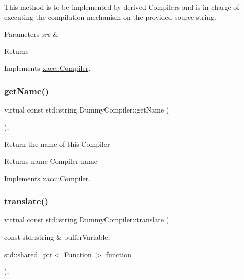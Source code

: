 This method is to be implemented by derived Compilers and is in charge of executing the compilation mechanism on the provided source string. 
\begin{DoxyParams}{Parameters}
{\em src} & \\
\hline
\end{DoxyParams}
\begin{DoxyReturn}{Returns}

\end{DoxyReturn}


Implements \hyperlink{a01100_a9092f5f779b570c91569b59621280c04}{xacc\+::\+Compiler}.

\mbox{\label{a00972_a76460cb78671dc2cf42f2bebf8fb80c7}} 
\subsubsection{\texorpdfstring{get\+Name()}{getName()}}
{\footnotesize\ttfamily virtual const std\+::string Dummy\+Compiler\+::get\+Name (\begin{DoxyParamCaption}{ }\end{DoxyParamCaption})\hspace{0.3cm}{\ttfamily [inline]}, {\ttfamily [virtual]}}

Return the name of this Compiler \begin{DoxyReturn}{Returns}
name Compiler name 
\end{DoxyReturn}


Implements \hyperlink{a01100_a87fca9100e6462122f5b687c3a0fb3fb}{xacc\+::\+Compiler}.

\mbox{\label{a00972_a606c27150c8d374242b8824e45b1e0c1}} 
\subsubsection{\texorpdfstring{translate()}{translate()}}
{\footnotesize\ttfamily virtual const std\+::string Dummy\+Compiler\+::translate (\begin{DoxyParamCaption}\item[{const std\+::string \&}]{buffer\+Variable,  }\item[{std\+::shared\+\_\+ptr$<$ \hyperlink{a01124}{Function} $>$}]{function }\end{DoxyParamCaption})\hspace{0.3cm}{\ttfamily [inline]}, {\ttfamily [virtual]}}

